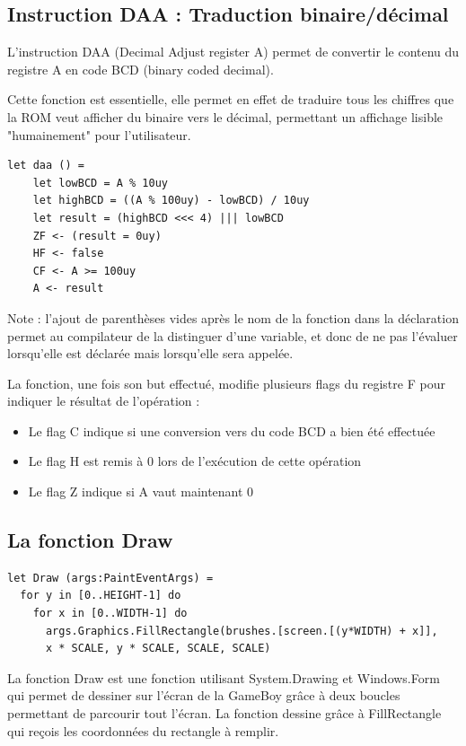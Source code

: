 \documentclass[12pt, a4paper]{article}
\begin{document}
\pagebreak

\subsection{Instruction DAA : Traduction binaire/décimal}

L'instruction DAA (Decimal Adjust register A) permet de convertir le contenu du registre A en code BCD (binary coded decimal).

\bigskip
Cette fonction est essentielle, elle permet en effet de traduire tous les chiffres que la ROM veut afficher du binaire vers le décimal, permettant un affichage lisible "humainement" pour l'utilisateur.

\bigskip

\small{\begin{lstlisting}[frame=single]
let daa () =
    let lowBCD = A % 10uy
    let highBCD = ((A % 100uy) - lowBCD) / 10uy
    let result = (highBCD <<< 4) ||| lowBCD
    ZF <- (result = 0uy)
    HF <- false
    CF <- A >= 100uy
    A <- result
\end{lstlisting}}

\bigskip
\large

Note : l'ajout de parenthèses vides après le nom de la fonction dans la déclaration permet au compilateur de la distinguer d'une variable, et donc de ne pas l'évaluer lorsqu'elle est déclarée mais lorsqu'elle sera appelée.

\bigskip
La fonction, une fois son but effectué, modifie plusieurs flags du registre F pour indiquer le résultat de l'opération :

\bigskip
\begin{itemize}
\item Le flag C indique si une conversion vers du code BCD a bien été effectuée
\item Le flag H est remis à 0 lors de l'exécution de cette opération
\item Le flag Z indique si A vaut maintenant 0
\end{itemize}

\pagebreak
\subsection{La fonction Draw}
\small \begin{lstlisting}[frame=single]
let Draw (args:PaintEventArgs) =
  for y in [0..HEIGHT-1] do
    for x in [0..WIDTH-1] do
      args.Graphics.FillRectangle(brushes.[screen.[(y*WIDTH) + x]],
      x * SCALE, y * SCALE, SCALE, SCALE)
\end{lstlisting}
\large
La fonction Draw est une fonction utilisant System.Drawing et Windows.Form qui permet de dessiner sur l'écran de la GameBoy grâce à deux boucles permettant de parcourir tout l'écran. La fonction dessine grâce à FillRectangle qui reçois les coordonnées du rectangle à remplir.
\end{document}
